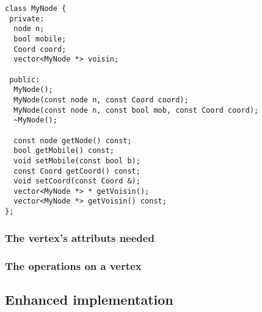 \begin{lstlisting}
class MyNode {
 private:
  node n;
  bool mobile;
  Coord coord;  
  vector<MyNode *> voisin;

 public:
  MyNode();
  MyNode(const node n, const Coord coord);
  MyNode(const node n, const bool mob, const Coord coord);
  ~MyNode();
  
  const node getNode() const;
  bool getMobile() const;
  void setMobile(const bool b);
  const Coord getCoord() const;
  void setCoord(const Coord &);
  vector<MyNode *> * getVoisin();
  vector<MyNode *> getVoisin() const;
};
\end{lstlisting}

\subsubsection{The vertex's attributs needed}


\subsubsection{The operations on a vertex}

\subsection{Enhanced implementation}
